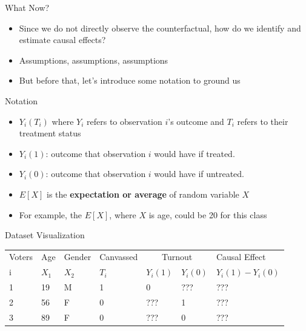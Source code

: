 \documentclass[]{beamer}
\begin{document}
\begin{frame}{What Now?}
	\begin{itemize}
		\item Since we do not directly observe the counterfactual, how do we identify and estimate causal effects? 
		\item \pause Assumptions, assumptions, assumptions
		\item \pause But before that, let's introduce some notation to ground us 
	\end{itemize}
\end{frame}

\begin{frame}{Notation}
	\begin{itemize}
		\item $Y_i(T_i)$ where $Y_i$ refers to observation $i$'s outcome and $T_i$ refers to their treatment status 
		\item $Y_i(1)$: outcome that observation $i$ would have if treated.
		\item $Y_i(0)$: outcome that observation $i$ would have if untreated. 
		\item $E[X]$ is the \textbf{expectation or average} of random variable $X$
		\item For example, the $E[X]$, where $X$ is age, could be 20 for this class
	\end{itemize}
\end{frame}

\begin{frame}{Dataset Visualization}

\begin{table}[]
\begin{tabular}{lllllll}
\hline
\multicolumn{1}{|l}{Voters} & Age   & Gender & Canvassed & \multicolumn{2}{c}{Turnout} & \multicolumn{1}{l|}{Causal Effect}     \\
\multicolumn{1}{|l}{i}      & $X_1$ & $X_2$  & $T_i$     & $Y_i(1)$     & $Y_i(0)$     & \multicolumn{1}{l|}{$Y_i(1) - Y_i(0)$} \\ \hline
1                           & 19    & M      & 1         & 0            & ???          &  ???                                      \\
2                           & 56    & F      & 0         & ???          & 1            &  ???                                   \\
3                           & 89    & F      & 0         & ???          & 0            &  ???                                     
\end{tabular}
\end{table}
\end{frame}
\end{document}
